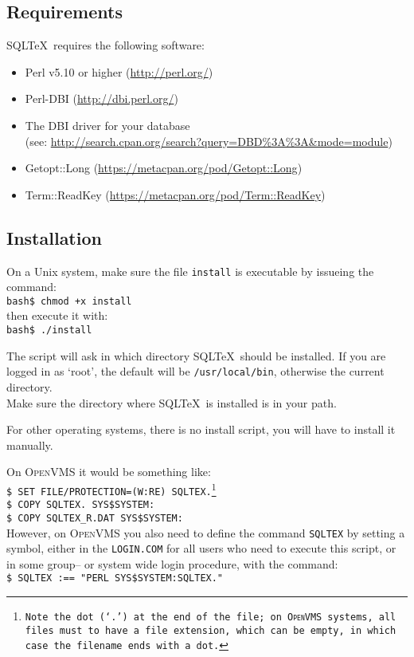 \documentclass{article}
\newcommand{\vs}{\vspace{3mm}}
\begin{document}
\subsection{Requirements}

SQL\TeX\ requires the following software:

\begin{itemize}
\item Perl v5.10 or higher (\url{http://perl.org/})
\item Perl-DBI      (\url{http://dbi.perl.org/})
\item The DBI driver for your database\\(see: \url{http://search.cpan.org/search?query=DBD\%3A\%3A\&mode=module})
\item Getopt::Long   (\url{https://metacpan.org/pod/Getopt::Long})
\item Term::ReadKey (\url{https://metacpan.org/pod/Term::ReadKey})
\end{itemize}

\subsection{Installation}

On a Unix system, make sure the file \texttt{install} is executable by issueing
the command:\\
\texttt{bash\$ chmod +x install}\\
then execute it with:\\
\texttt{bash\$ ./install}

The script will ask in which directory SQL\TeX\ should be installed. If you are
logged in as `root', the default will be \texttt{/usr/local/bin}, otherwise the
current directory.\\
Make sure the directory where SQL\TeX\ is installed is in your path.

\vs

For other operating systems, there is no install script, you will have to install
it manually.

On \textsc{OpenVMS} it would be something like:\\
\texttt{\$ SET FILE/PROTECTION=(W:RE) SQLTEX.\footnote{Note the dot (`.') at the end of the file; on
\textsc{OpenVMS} systems, all files must to have a file extension, which can
be empty, in which case the filename ends with a dot.}\\
\$ COPY SQLTEX. SYS\$SYSTEM:\\
\$ COPY SQLTEX\_R.DAT SYS\$SYSTEM:}\\
However, on \textsc{OpenVMS} you also need to define the command \texttt{SQLTEX} by setting a symbol,
either in the \texttt{LOGIN.COM} for all users who need to execute this script, or in some group-- or
system wide login procedure, with the command:  \\
\texttt{\$ SQLTEX :== "PERL SYS\$SYSTEM:SQLTEX."} 
\end{document}
